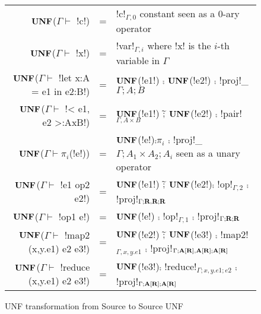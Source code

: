 \begin{figure*}[t]
    \begin{tabular}{r c l}
    $\mathbf{UNF}$($\Gamma\vdash $ !c!) &=& !c!$_{\Gamma,0}$ constant seen as a 0-ary operator\\
    $\mathbf{UNF}$($\Gamma\vdash $ !x!) &=& !var!$_{\Gamma,i}$ where !x! is the $i$-th variable in $\Gamma$ \\
    $\mathbf{UNF}$($\Gamma\vdash $ !let x:A = e1 in e2:B!) &=& $\mathbf{UNF}$(!e1!) $\comp$ $\mathbf{UNF}$(!e2!) $\comp$ !proj!_${\Gamma;A;B}$  \\ 
    $\mathbf{UNF}$($\Gamma\vdash $ !< e1, e2 >:AxB!) &=& $\mathbf{UNF}$(!e1!) $\widetilde{;}$ $\mathbf{UNF}$(!e2!) $\comp$ !pair!$_{\Gamma,A\times B}$ \\ 
    $\mathbf{UNF}$($\Gamma\vdash \pi_i$(!e!)) &=& $\mathbf{UNF}$(!e!)$\comp $$\pi_i$ $\comp$ !proj!_${\Gamma;A_1\times A_2;A_i}$ seen as a unary operator\\
    $\mathbf{UNF}$($\Gamma\vdash $ !e1 op2 e2!) &=& $\mathbf{UNF}$(!e1!) $\widetilde{;}$ $\mathbf{UNF}$(!e2!)$\comp$ !op!$_{\Gamma,2}$ $\comp$ !proj!$_{\Gamma;\mathbf{R},\mathbf{R};\mathbf{R}}$ \\
    $\mathbf{UNF}$($\Gamma\vdash $ !op1 e!) &=& $\mathbf{UNF}$(!e!) $\comp$ !op!$_{\Gamma,1}$ $\comp$ !proj!$_{\Gamma;\mathbf{R};\mathbf{R}}$ \\
    $\mathbf{UNF}$($\Gamma\vdash $ !map2 (x,y.e1) e2 e3!) &=& $\mathbf{UNF}$(!e2!) $\widetilde{;}$ $\mathbf{UNF}$(!e3!) $\comp$ !map2!$_{\Gamma, x,y.e1}$ $\comp$ !proj!$_{\Gamma;\mathbf{A}[\mathbf{R}],\mathbf{A}[\mathbf{R}];\mathbf{A}[\mathbf{R}]}$ \\ 
    $\mathbf{UNF}$($\Gamma\vdash $ !reduce (x,y.e1) e2 e3!) &=& $\mathbf{UNF}$(!e3!)$\comp$ !reduce!$_{\Gamma; x,y.e1; e2}$ $\comp$ !proj!$_{\Gamma;\mathbf{A}[\mathbf{R}];\mathbf{A}[\mathbf{R}]}$ \\ 
    \end{tabular}
    \caption{UNF transformation from Source to Source UNF}
    \label{fig:source_to_unf}
    \end{figure*}